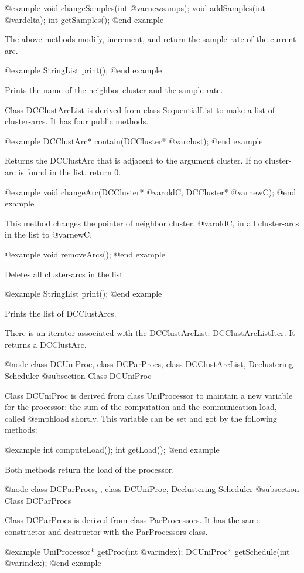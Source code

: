@example
void changeSamples(int @var{newsamps});
void addSamples(int @var{delta});
int getSamples();
@end example

The above methods modify, increment, and return the sample rate of the current
arc.

@example
StringList print();
@end example

Prints the name of the neighbor cluster and the sample rate.

Class DCClustArcList is derived from class SequentialList to make a list
of cluster-arcs. It has four public methods.

@example
DCClustArc* contain(DCCluster* @var{clust});
@end example

Returns the DCClustArc that is adjacent to the argument cluster. If no
cluster-arc is found in the list, return 0.

@example
void changeArc(DCCluster* @var{oldC}, DCCluster* @var{newC});
@end example

This method changes the pointer of neighbor cluster, @var{oldC},
in all cluster-arcs in the list to @var{newC}.

@example
void removeArcs();
@end example

Deletes all cluster-arcs in the list.

@example
StringList print();
@end example

Prints the list of DCClustArcs.

There is an iterator associated with the DCClustArcList: DCClustArcListIter.
It returns a DCClustArc.

@node class DCUniProc, class DCParProcs, class DCClustArcList, Declustering Scheduler
@subsection Class DCUniProc

Class DCUniProc is derived from class UniProcessor to maintain a new
variable for the processor: the sum of the computation and the communication
load, called @emph{load} shortly. This variable can be set and got by 
the following methods:

@example
int computeLoad();
int getLoad();
@end example

Both methods return the load of the processor.

@node class DCParProcs, , class DCUniProc, Declustering Scheduler
@subsection Class DCParProcs

Class DCParProcs is derived from class ParProcessors. It has the same
constructor and destructor with the ParProcessors class.

@example
UniProcessor* getProc(int @var{index});
DCUniProc* getSchedule(int @var{index});
@end example

